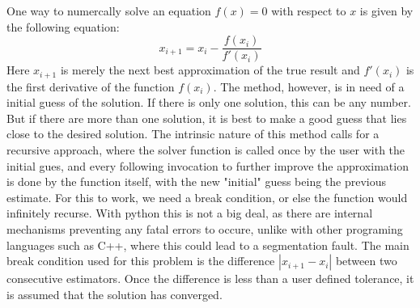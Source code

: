 \documentclass{aa}
\begin{document}
One way to numercally solve an equation \(f(x) = 0\) with respect to \(x\) is
given by the following equation:
\begin{equation}
    \label{equ:newton_iterator}
    x_{i+1} = x_i - \frac{f(x_i)}{f'(x_i)}
\end{equation}
Here \(x_{i+1}\) is merely the next best approximation of the true result and
\(f'(x_i)\) is the first derivative of the function \(f(x_i)\). The
method, however, is in need of a initial guess of the solution. If there is only
one solution, this can be any number. But if there are more than one solution,
it is best to make a good guess that lies close to the desired solution. The
intrinsic nature of this method calls for a recursive approach, where the solver
function is called once by the user with the initial gues, and every following
invocation to further improve the approximation is done by the function itself,
with the new "initial" guess being the previous estimate. For this to work, we
need a break condition, or else the function would infinitely recurse. With
python this is not a big deal, as there are internal mechanisms preventing any
fatal errors to occure, unlike with other programing languages such as C++,
where this could lead to a segmentation fault. The main break condition used for
this problem is the difference \(|x_{i+1} - x_i|\) between two consecutive
estimators. Once the difference is less than a user defined tolerance, it is
assumed that the solution has converged.
\end{document}

